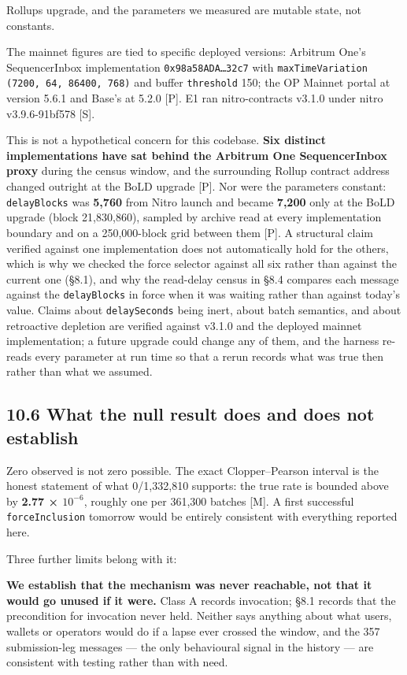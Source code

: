 \documentclass[conference]{IEEEtran}
\renewcommand{\_}{\textunderscore\allowbreak}
\begin{document}
Rollups upgrade, and the parameters we measured are mutable state, not
constants.

The mainnet figures are tied to specific deployed versions: Arbitrum
One's SequencerInbox implementation \texttt{0x98a58ADA…32c7} with
\texttt{maxTimeVariation} \texttt{(7200,\ 64,\ 86400,\ 768)} and buffer
\texttt{threshold} 150; the OP Mainnet portal at version 5.6.1 and
Base's at 5.2.0 {[}P{]}. E1 ran nitro-contracts v3.1.0 under nitro
v3.9.6-91bf578 {[}S{]}.

This is not a hypothetical concern for this codebase. \textbf{Six
distinct implementations have sat behind the Arbitrum One SequencerInbox
proxy} during the census window, and the surrounding Rollup contract
address changed outright at the BoLD upgrade {[}P{]}. Nor were the
parameters constant: \texttt{delayBlocks} was \textbf{5,760} from Nitro
launch and became \textbf{7,200} only at the BoLD upgrade (block
21,830,860), sampled by archive read at every implementation boundary
and on a 250,000-block grid between them {[}P{]}. A structural claim
verified against one implementation does not automatically hold for the
others, which is why we checked the force selector against all six
rather than against the current one (§8.1), and why the read-delay
census in §8.4 compares each message against the \texttt{delayBlocks} in
force when it was waiting rather than against today's value. Claims
about \texttt{delaySeconds} being inert, about batch semantics, and
about retroactive depletion are verified against v3.1.0 and the deployed
mainnet implementation; a future upgrade could change any of them, and
the harness re-reads every parameter at run time so that a rerun records
what was true then rather than what we assumed.

\subsection{10.6 What the null result does and does not
establish}\label{what-the-null-result-does-and-does-not-establish}

Zero observed is not zero possible. The exact Clopper--Pearson interval
is the honest statement of what 0/1,332,810 supports: the true rate is
bounded above by \textbf{2.77 × \(10^{-6}\)}, roughly one per 361,300
batches {[}M{]}. A first successful \texttt{forceInclusion} tomorrow
would be entirely consistent with everything reported here.

Three further limits belong with it:

\textbf{We establish that the mechanism was never reachable, not that it
would go unused if it were.} Class A records invocation; §8.1 records
that the precondition for invocation never held. Neither says anything
about what users, wallets or operators would do if a lapse ever crossed
the window, and the 357 submission-leg messages --- the only behavioural
signal in the history --- are consistent with testing rather than with
need.
\end{document}
